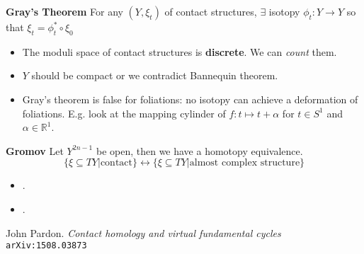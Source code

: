 \documentclass[12pt]{article}
\begin{document}
{\noindent \textbf{Gray's Theorem} For any $(Y, \xi_t)$ of contact structures, $\exists$ isotopy $\phi_t: Y \to Y$ so that $\xi_t = \phi_t^\ast \circ \xi_0$
\begin{itemize}
	\item The moduli space of contact structures is \textbf{discrete}.  We can \textit{count}  them.
	\item $Y$ should be compact or we contradict Bannequin theorem. 
	\item Gray's theorem is false for foliations: no isotopy can achieve a deformation of foliations.  E.g. look at the mapping cylinder of $f:t \mapsto t + \alpha$ for $t \in S^1$ and $\alpha \in \mathbb{R}^1$.
\end{itemize}

\noindent \textbf{Gromov} Let $Y^{2n-1}$ be open, then we have a homotopy equivalence.
$$ \{ \xi \subseteq TY | \text{contact} \}  \leftrightarrow \{ \xi \subseteq TY | \text{almost complex structure} \} $$
\begin{itemize}
	\item .
	\item .
\end{itemize}


\begin{thebibliography}{9}


John Pardon. \textit{Contact homology and virtual fundamental cycles}  \texttt{arXiv:1508.03873}


\end{thebibliography}
}
\end{document}

